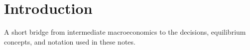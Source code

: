 \clearpage
\part{Introduction}\label{part:introduction}

A short bridge from intermediate macroeconomics to the decisions, equilibrium
concepts, and notation used in these notes.


